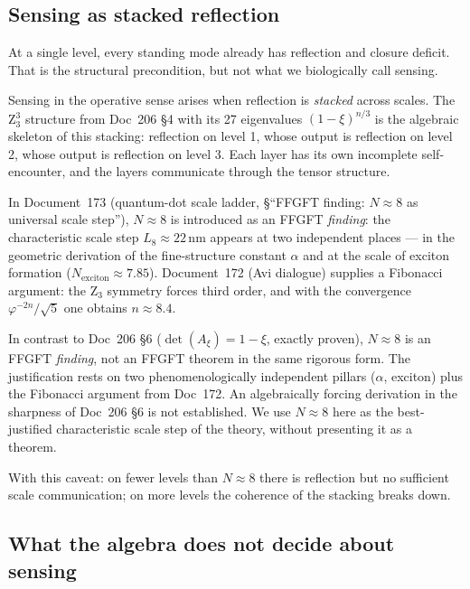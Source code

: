 \subsection{Sensing as stacked reflection}\label{sec:reflection_stack}

At a single level, every standing mode already has reflection and closure deficit. That is the structural precondition, but not what we biologically call sensing.

Sensing in the operative sense arises when reflection is \emph{stacked} across scales. The Z$_3^3$ structure from Doc~206 \S4 with its 27 eigenvalues $(1-\xi)^{n/3}$ is the algebraic skeleton of this stacking: reflection on level 1, whose output is reflection on level 2, whose output is reflection on level 3. Each layer has its own incomplete self-encounter, and the layers communicate through the tensor structure.

In Document~173 (quantum-dot scale ladder, \S``FFGFT finding: $N \approx 8$ as universal scale step''), $N \approx 8$ is introduced as an FFGFT \emph{finding}: the characteristic scale step $L_8 \approx 22$\,nm appears at two independent places --- in the geometric derivation of the fine-structure constant $\alpha$ and at the scale of exciton formation ($N_{\text{exciton}} \approx 7.85$). Document~172 (Avi dialogue) supplies a Fibonacci argument: the Z$_3$ symmetry forces third order, and with the convergence $\varphi^{-2n}/\sqrt{5}$ one obtains $n \approx 8.4$.

\begin{important}
In contrast to Doc~206 \S6 ($\det(A_\xi) = 1-\xi$, exactly proven), $N \approx 8$ is an FFGFT \emph{finding}, not an FFGFT theorem in the same rigorous form. The justification rests on two phenomenologically independent pillars ($\alpha$, exciton) plus the Fibonacci argument from Doc~172. An algebraically forcing derivation in the sharpness of Doc~206 \S6 is not established. We use $N \approx 8$ here as the best-justified characteristic scale step of the theory, without presenting it as a theorem.
\end{important}

With this caveat: on fewer levels than $N \approx 8$ there is reflection but no sufficient scale communication; on more levels the coherence of the stacking breaks down.

\subsection{What the algebra does not decide about sensing}\label{sec:reflection_limit}

